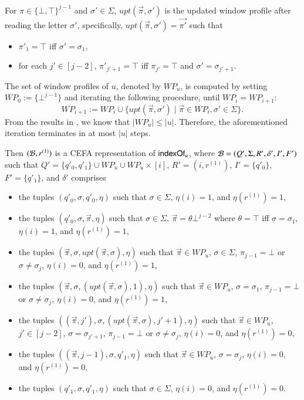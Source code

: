 For $\pi \in \{\bot, \top\}^{j-1}$ and $\sigma' \in \Sigma$, $upt(\vec{\pi}, \sigma')$ is the updated window profile after reading the letter $\sigma'$, specifically, $upt(\vec{\pi}, \sigma') = \vec{\pi'}$ such that  
\begin{itemize}
\item $\pi'_1 = \top$ iff $\sigma' = \sigma_1$, 
%
\item for each $j' \in [j-2]$, $\pi'_{j'+1} = \top$ iff $\pi_{j'} = \top$ and $\sigma' = \sigma_{j'+1}$. 
\end{itemize}
The set of window profiles of $u$, denoted by $WP_u$, is computed by setting $WP_0 := \{\bot^{j-1}\}$ and iterating the following procedure, until $WP_i = WP_{i+1}$:
\[WP_{i+1}:=WP_i \cup \{upt(\vec{\pi}, \sigma') \mid \vec{\pi} \in WP_i, \sigma' \in \Sigma\}.\] 
From the results in \cite{CCH+18}, we know that $|WP_u| \le |u|$. Therefore, the aforementioned iteration terminates in at most $|u|$ steps.


Then $(\mathcal{B}, r^{(1)})$ is a CEFA representation of $\mathsf{indexOf}_u$, where 
$\mathcal{B}= (Q', \Sigma, R', \delta', I', F')$ such that  $Q' = \{q'_0, q'_1\} \cup WP_u \cup WP_u \times [i]$, $R'=(i, r^{(1)})$, $I'=\{q'_0\}$, $F'=\{q'_1\}$, and $\delta'$ comprises 
\begin{itemize}
\item the tuples $(q'_0, \sigma, q'_0, \eta)$ such that $\sigma \in \Sigma$, $\eta(i)=1$, and $\eta(r^{(1)}) = 1$,
%
\item the tuples $(q'_0, \sigma, \vec{\pi}, \eta)$ such that $\sigma \in \Sigma$, $\vec{\pi} = \theta \bot^{j-2}$ where $\theta  = \top$ iff $\sigma = \sigma_1$, $\eta(i) = 1$, and $\eta(r^{(1)})= 1$,
% 
\item the tuples  $(\vec{\pi}, \sigma, upt(\vec{\pi}, \sigma), \eta)$ such that $\vec{\pi} \in WP_u$, $\sigma \in \Sigma$, $\pi_{j-1} = \bot$ or $\sigma \neq \sigma_{j}$, $\eta(i) = 0$, and $\eta(r^{(1)})= 1$,
%
\item the tuples $(\vec{\pi}, \sigma, (upt(\vec{\pi}, \sigma), 1), \eta)$ such that $\vec{\pi} \in WP_u$, $\sigma = \sigma_1$, $\pi_{j-1} = \bot$ or $\sigma \neq \sigma_{j}$, $\eta(i) = 0$, and $\eta(r^{(1)})= 1$,
%
\item the tuples $((\vec{\pi}, j'),  \sigma, (upt(\vec{\pi}, \sigma), j'+1), \eta)$ such that $\vec{\pi} \in WP_u$, $j' \in [j-2]$, $\sigma = \sigma_{j'+1}$, $\pi_{j-1} = \bot$ or $\sigma \neq \sigma_{j}$, $\eta(i) = 0$, and $\eta(r^{(1)})= 0$,
%
\item the tuples $((\vec{\pi}, j-1),  \sigma, q'_1, \eta)$ such that $\vec{\pi} \in WP_u$, $\sigma = \sigma_{j}$, $\eta(i) =0$, and $\eta(r^{(1)})= 0$,
%
\item the tuples  $(q'_1, \sigma, q'_1, \eta)$ such that $\sigma \in \Sigma$, $\eta(i) = 0$, and $\eta(r^{(1)})= 0$.
\end{itemize}



